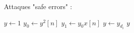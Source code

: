             \begin{remq}
                Attaques "safe errors" :
                \begin{algorithm}
                    \caption{$y = x^d [n]$}
                    \begin{algorithmic}
                            \State $y \gets 1$
                                \State $y_0 \gets y^2[n]$
                                \State $y_1 \gets y_0x [n]$
                                \State $y \gets y_{d_i}$
                            \EndFor
                        \State \Return $y$
                        \EndFunction
                    \end{algorithmic}
                \end{algorithm}
            \end{remq}

